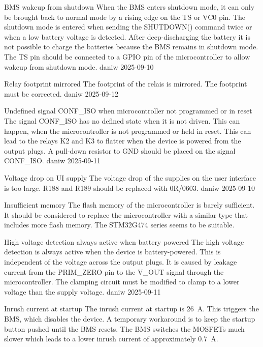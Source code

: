 \begin{ModTable}

\ModItemDone
{\acs{BMS} wakeup from shutdown}
{When the \ac{BMS} enters shutdown mode, it can only be brought back to normal mode by a rising edge on the TS or VC0 pin. The shutdown mode is entered when sending the SHUTDOWN() command twice or when a low battery voltage is detected. After deep-discharging the battery it is not possible to charge the batteries because the \ac{BMS} remains in shutdown mode. }
{The TS pin should be connected to a GPIO pin of the microcontroller to allow wakeup from shutdown mode. }
{daniw}
{2025-09-10}

\ModItemDone
{Relay footprint mirrored}
{The footprint of the relais is mirrored. }
{The footprint must be corrected. }
{daniw}
{2025-09-12}

\ModItemDone
{Undefined signal CONF\_ISO when microcontroller not programmed or in reset}
{The signal CONF\_ISO has no defined state when it is not driven. This can happen, when the microcontroller is not programmed or held in reset. This can lead to the relays K2 and K3 to flatter when the device is powered from the output plugs. }
{A pull-down resistor to GND should be placed on the signal CONF\_ISO. }
{daniw}
{2025-09-11}

\ModItemDone
{Voltage drop on UI supply}
{The voltage drop of the supplies on the user interface is too large. }
{R188 and R189 should be replaced with 0R/0603. }
{daniw}
{2025-09-10}

\ModItemOpen
{Insufficient memory}
{The flash memory of the microcontroller is barely sufficient. }
{It should be considered to replace the microcontroller with a similar type that includes more flash memory. The STM32G474 series seems to be suitable. }
{}
{}

\ModItemDone
{High voltage detection always active when battery powered}
{The high voltage detection is always active when the device is battery-powered. This is independent of the voltage across the output plugs. It is caused by leakage current from the PRIM\_ZERO pin to the V\_OUT signal through the microcontroller. }
{The clamping circuit must be modified to clamp to a lower voltage than the supply voltage. }
{daniw}
{2025-09-11}

\ModItemOpen
{Inrush current at startup}
{The inrush current at startup is \qty{26}{\ampere}. This triggers the \ac{BMS}, which disables the device. }
{A temporary workaround is to keep the startup button pushed until the \ac{BMS} resets. The \ac{BMS} switches the \acp{MOSFET} much slower which leads to a lower inrush current of approximately \qty{0.7}{\ampere}. }
{}
{}


\end{ModTable}
